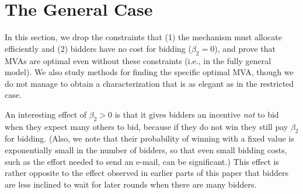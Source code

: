 \section{The General Case}
\label{sec:general}

In this section, we drop the constraints that (1) the mechanism must
allocate efficiently and (2) bidders have no cost for bidding ($\beta_2=0$), and prove that MVAs are optimal
even without these constraints (i.e., in the fully general model).  We also
study methods for finding the specific optimal MVA, though we do not manage
to obtain a characterization that is as elegant as in the restricted case.



An interesting effect of $\beta_2>0$ is that it gives bidders an incentive
{\em not} to bid when they expect many others to bid, because if they do
not win they still pay $\beta_2$ for bidding. (Also, we note that their
probability of winning with a fixed value is exponentially small in the
number of bidders, so that even small bidding costs, such as the effort
needed to send an e-mail, can be significant.)  This effect is rather
opposite to the effect observed in earlier parts of this paper that bidders
are less inclined to wait for later rounds when there are many bidders.

